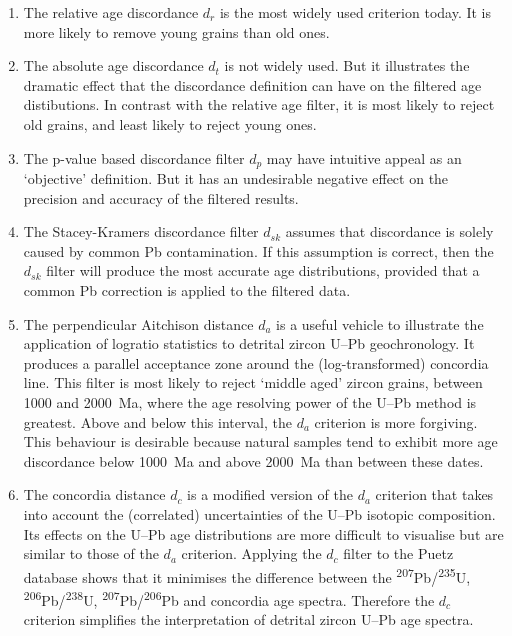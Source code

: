 \documentclass[gchron, manuscript]{copernicus}
\begin{document}
\begin{enumerate}
  \item The relative age discordance $d_r$ is the most widely used
    criterion today. It is more likely to remove young grains than old
    ones.
  \item The absolute age discordance $d_t$ is not widely used. But it
    illustrates the dramatic effect that the discordance definition
    can have on the filtered age distibutions. In contrast with the
    relative age filter, it is most likely to reject old grains, and
    least likely to reject young ones.
  \item The p-value based discordance filter $d_p$ may have intuitive
    appeal as an `objective' definition. But it has an undesirable
    negative effect on the precision and accuracy of the filtered
    results.
  \item The Stacey-Kramers discordance filter $d_{sk}$ assumes that
    discordance is solely caused by common Pb contamination. If this
    assumption is correct, then the $d_{sk}$ filter will produce the
    most accurate age distributions, provided that a
    \citet{stacey1975} common Pb correction is applied to the filtered
    data.
  \item The perpendicular Aitchison distance $d_a$ is a useful vehicle
    to illustrate the application of logratio statistics to detrital
    zircon U--Pb geochronology. It produces a parallel acceptance zone
    around the (log-transformed) concordia line. This filter is most
    likely to reject `middle aged' zircon grains, between 1000 and
    2000~Ma, where the age resolving power of the U--Pb method is
    greatest. Above and below this interval, the $d_a$ criterion is
    more forgiving. This behaviour is desirable because natural
    samples tend to exhibit more age discordance below 1000~Ma and
    above 2000~Ma than between these dates.
  \item The concordia distance $d_c$ is a modified version of the
    $d_a$ criterion that takes into account the (correlated)
    uncertainties of the U--Pb isotopic composition.  Its effects on
    the U--Pb age distributions are more difficult to visualise but
    are similar to those of the $d_a$ criterion.  Applying the $d_c$
    filter to the Puetz database shows that it minimises the
    difference between the
    \textsuperscript{207}Pb/\textsuperscript{235}U,
    \textsuperscript{206}Pb/\textsuperscript{238}U,
    \textsuperscript{207}Pb/\textsuperscript{206}Pb and concordia age
    spectra. Therefore the $d_c$ criterion simplifies the
    interpretation of detrital zircon U--Pb age spectra.
\end{enumerate}
\end{document}
